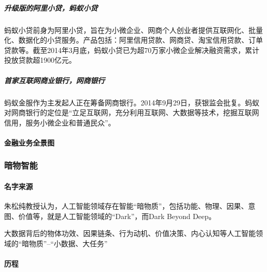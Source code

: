 \documentclass[letterpaper,11pt,english]{sphinxmanual}
\begin{document}
\subparagraph{升级版的阿里小贷，蚂蚁小贷}
\label{\detokenize{chapter_company/alipay:id15}}
蚂蚁小贷前身为阿里小贷，旨在为小微企业、网商个人创业者提供互联网化、批量化、数据化的小贷服务。产品包括：阿里信用贷款、网商贷、淘宝信用贷款、订单贷款等。截至2014年3月底，蚂蚁小贷已为超70万家小微企业解决融资需求，累计投放贷款超1900亿元。


\subparagraph{首家互联网商业银行，网商银行}
\label{\detokenize{chapter_company/alipay:id16}}
蚂蚁金服作为主发起人正在筹备网商银行。2014年9月29日，获银监会批复。蚂蚁对网商银行的定位是“立足互联网，充分利用互联网、大数据等技术，挖掘互联网信用，服务小微企业和普通民众”。


\paragraph{金融业务全景图}
\label{\detokenize{chapter_company/alipay:id17}}


\subsubsection{暗物智能}
\label{\detokenize{chapter_company/dm-ai:id1}}\label{\detokenize{chapter_company/dm-ai::doc}}

\paragraph{名字来源}
\label{\detokenize{chapter_company/dm-ai:id2}}
朱松纯教授认为，人工智能领域存在智能“暗物质”，包括功能、物理、因果、意图、价值等，就是人工智能领域的“Dark”，而Dark
Beyond
Deep。%
\begin{footnote}[884]\sphinxAtStartFootnote
{}
%
\end{footnote}
大数据背后的物体功效、因果链条、行为动机、价值决策、内心认知等人工智能领域的“暗物质”–“小数据、大任务”


\paragraph{历程}
\label{\detokenize{chapter_company/dm-ai:id3}}
\end{document}
